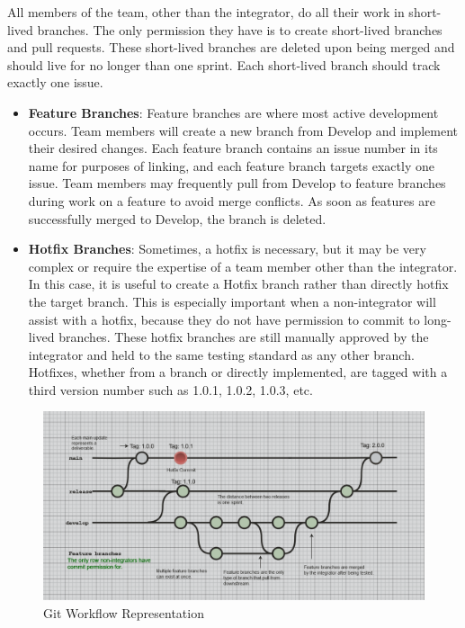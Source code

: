  All members of the team, other than the integrator, do all their work in short-lived branches.
 The only permission they have is to create short-lived branches and pull requests.
 These short-lived branches are deleted upon being merged and should live for no longer than one sprint.
 Each short-lived branch should track exactly one issue.

 \begin{itemize}
    \item \textbf{Feature Branches}: Feature branches are where most active development occurs. Team members will create a new branch from Develop and implement their desired changes. Each feature branch contains an issue number in its name for purposes of linking, and each feature branch targets exactly one issue. Team members may frequently pull from Develop to feature branches during work on a feature to avoid merge conflicts. As soon as features are successfully merged to Develop, the branch is deleted.
    \item  \textbf{Hotfix Branches}: Sometimes, a hotfix is necessary, but it may be very complex or require the expertise of a team member other than the integrator. In this case, it is useful to create a Hotfix branch rather than directly hotfix the target branch. This is especially important when a non-integrator will assist with a hotfix, because they do not have permission to commit to long-lived branches. These hotfix branches are still manually approved by the integrator and held to the same testing standard as any other branch. Hotfixes, whether from a branch or directly implemented, are tagged with a third version number such as 1.0.1, 1.0.2, 1.0.3, etc. 
 \end{itemize}

 \begin{figure}
\centering
    \includegraphics[width=0.9\linewidth]{Figures/git-workflow.png}
    \caption{Git Workflow Representation}
    \label{fig:git-workflow}
\end{figure}


